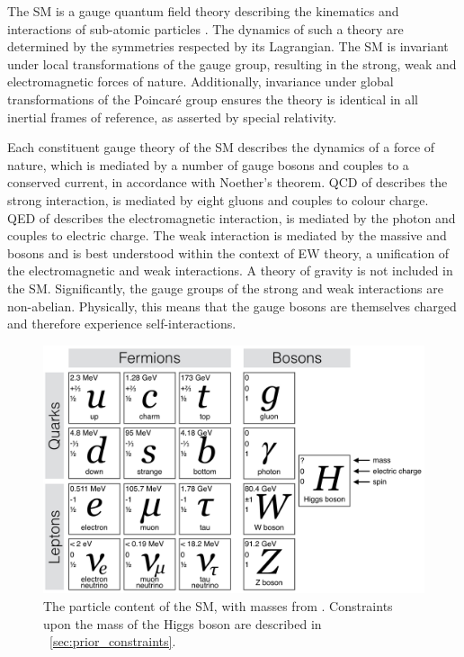 
The \ac{SM} is a gauge quantum field theory describing the kinematics and interactions of 
sub-atomic particles \cite{Aitchison,Peskin}. The dynamics of such a theory are determined 
by the symmetries respected by its Lagrangian. The \ac{SM} is invariant under local 
transformations of the \SMgroup gauge group, resulting in the strong, weak and 
electromagnetic forces of nature. Additionally, invariance under global transformations of 
the Poincaré group ensures the theory is identical in all inertial frames of reference, as 
asserted by special relativity.

Each constituent gauge theory of the \ac{SM} describes the dynamics of a force of nature, 
which is mediated by a number of gauge bosons and couples to a conserved current, in 
accordance with Noether's theorem. \ac{QCD} of  describes the strong 
interaction, is mediated by eight gluons and couples to colour charge. \ac{QED} of 
 describes the electromagnetic interaction, is mediated by the 
photon and couples to electric charge. The weak interaction is mediated by the massive 
\PWpm and \PZ bosons and is best understood within the context of \ac{EW} theory,
a unification of the electromagnetic and weak interactions. A theory of
gravity is not included in the \ac{SM}. Significantly, the gauge groups of 
the strong and weak interactions are non-abelian. Physically, this means that the
gauge bosons are themselves charged and therefore experience self-interactions.

\begin{figure}
	\includegraphics[width=\largefigwidth]{tex/motivation/sm_particles}
	\caption{The particle content of the \ac{SM}, with masses from \cite{PDG}. Constraints
	upon the mass of the Higgs boson are described in \Section~\ref{sec:prior_constraints}.}
	\label{fig:sm_particles}
\end{figure}

